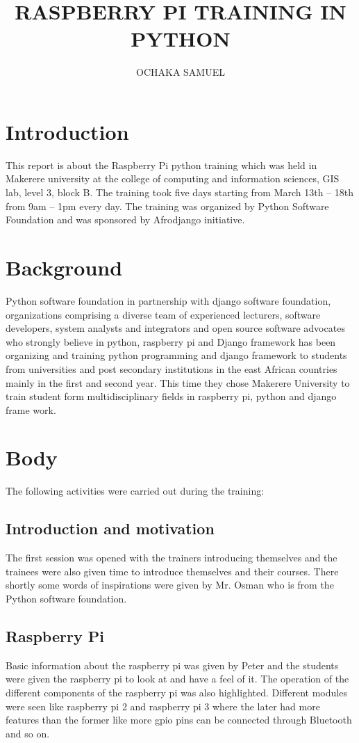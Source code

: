 \documentclass{article}
\title{RASPBERRY PI TRAINING IN PYTHON}
\author{OCHAKA SAMUEL}
\begin{document}
\maketitle

\section{Introduction}
This report is about the Raspberry Pi python training which was held in Makerere university at the college of computing and information sciences, GIS lab, level 3, block B. The training took five days starting from March 13th – 18th from 9am – 1pm every day. The training was organized by Python Software Foundation and was sponsored by Afrodjango initiative.

\section{Background}
Python software foundation in partnership with django software foundation, organizations comprising a diverse team of experienced lecturers, software developers, system analysts and integrators and open source software advocates who strongly believe in python, raspberry pi and Django framework has been organizing and training python programming and django framework to students from universities and post secondary institutions in the east African countries mainly in the first and second year. This time they chose Makerere University to train student form multidisciplinary fields in raspberry pi, python and django frame work.

\section{Body}
The following activities were carried out during the training:
\subsection{Introduction and motivation}
The first session was opened with the trainers introducing themselves and the trainees were also given time to introduce themselves and their courses. There shortly some words of inspirations were given by Mr. Osman who is from the Python software foundation.
\subsection{Raspberry Pi}
Basic information about the raspberry pi was given by Peter and the students were given the raspberry pi to look at and have a feel of it. The operation of the different components of the raspberry pi was also highlighted. Different modules were seen like raspberry pi 2 and raspberry pi 3 where the later had more features than the former like more gpio pins can be connected through Bluetooth and so on.
\end{document}
